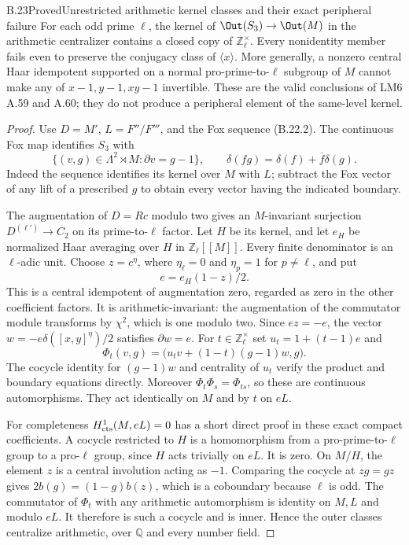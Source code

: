 \begin{statement}{B.23}{Proved}{Unrestricted arithmetic kernel classes and their exact peripheral failure}
For each odd prime $\ell$, the kernel of
$\Out(S_3)\to\Out(M)$ in the arithmetic centralizer contains
a closed copy of $\mathbb Z_\ell^\times$. Every nonidentity
member fails even to preserve the conjugacy class of
$\langle x\rangle$. More generally, a nonzero central Haar
idempotent supported on a normal pro-prime-to-$\ell$ subgroup
of $M$ cannot make any of $x-1,y-1,xy-1$ invertible.
These are the valid conclusions of LM6 A.59 and A.60;
they do not produce a peripheral element of the same-level kernel.
\end{statement}
\begin{proof}
Use $D=M'$, $L=F''/F'''$, and the Fox sequence (B.22.2).
The continuous Fox map identifies $S_3$ with
\[
 \{(v,g)\in\Lambda^2\rtimes M:\partial v=g-1\},
 \qquad\delta(fg)=\delta(f)+\overline f\delta(g).
 \tag{B.23.1}
\]
Indeed the sequence identifies its kernel over $M$ with $L$;
subtract the Fox vector of any lift of a prescribed $g$ to
obtain every vector having the indicated boundary.

The augmentation of $D=Rc$ modulo two gives an $M$-invariant
surjection $D^{(\ell')}\to C_2$ on its prime-to-$\ell$ factor.
Let $H$ be its kernel, and let $e_H$ be normalized Haar averaging
over $H$ in $\mathbb Z_\ell[[M]]$. Every finite denominator
is an $\ell$-adic unit. Choose $z=c^\eta$, where $\eta_\ell=0$
and $\eta_p=1$ for $p\ne\ell$, and put
\[
                         e=e_H(1-z)/2.
\]
This is a central idempotent of augmentation zero, regarded as
zero in the other coefficient factors. It is arithmetic-invariant:
the augmentation of the commutator module transforms by
$\chi^2$, which is one modulo two. Since $ez=-e$, the vector
$w=-e\delta([x,y]^\eta)/2$ satisfies $\partial w=e$.
For $t\in\mathbb Z_\ell^\times$ set $u_t=1+(t-1)e$ and
\[
 \Phi_t(v,g)=\bigl(u_t v+(1-t)(g-1)w,g\bigr).
 \tag{B.23.2}
\]
The cocycle identity for $(g-1)w$ and centrality of $u_t$ verify
the product and boundary equations directly. Moreover
$\Phi_t\Phi_s=\Phi_{ts}$, so these are continuous automorphisms.
They act identically on $M$ and by $t$ on $eL$.

For completeness $H^1_{\rm cts}(M,eL)=0$ has a short direct
proof in these exact compact coefficients. A cocycle restricted
to $H$ is a homomorphism from a pro-prime-to-$\ell$ group to a
pro-$\ell$ group, since $H$ acts trivially on $eL$. It is zero.
On $M/H$, the element $z$ is a central involution acting as
$-1$. Comparing the cocycle at $zg=gz$ gives
$2b(g)=(1-g)b(z)$, which is a coboundary because $\ell$ is odd.
The commutator of $\Phi_t$ with any arithmetic automorphism is
identity on $M,L$ and modulo $eL$. It therefore is such a
cocycle and is inner. Hence the outer classes centralize
arithmetic, over $\mathbb Q$ and every number field.


\end{proof}
